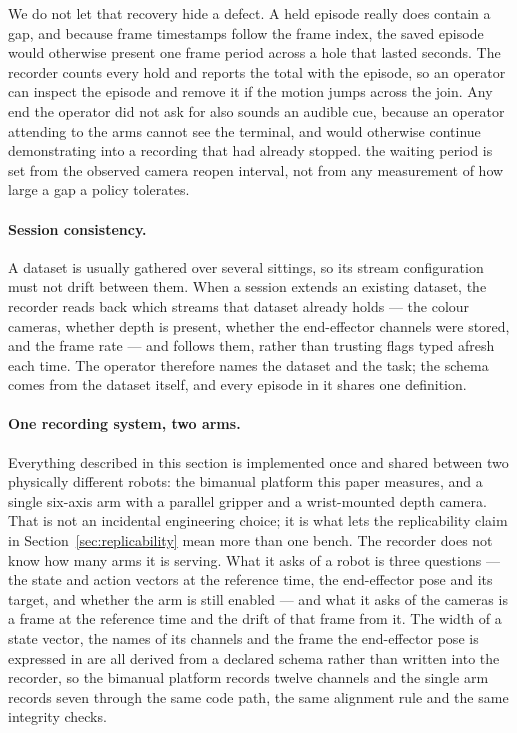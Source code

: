 We do not let that recovery hide a defect. A held episode really does contain a
gap, and because frame timestamps follow the frame index, the saved episode
would otherwise present one frame period across a hole that lasted seconds. The
recorder counts every hold and reports the total with the episode, so an
operator can inspect the episode and remove it if the motion jumps across the
join. Any end the operator did not ask for also sounds an audible cue, because
an operator attending to the arms cannot see the terminal, and would otherwise
continue demonstrating into a recording that had already stopped.
\unjustified{} the waiting period is set from the observed camera
reopen interval, not from any measurement of how large a gap a policy tolerates.

\paragraph{Session consistency.} A dataset is usually gathered over several
sittings, so its stream configuration must not drift between them. When a
session extends an existing dataset, the recorder reads back which streams
that dataset already holds --- the colour cameras, whether depth is present,
whether the end-effector channels were stored, and the frame rate --- and
follows them, rather than trusting flags typed afresh each time. The operator
therefore names the dataset and the task; the schema comes from the dataset
itself, and every episode in it shares one definition.

\paragraph{One recording system, two arms.} Everything described in this section
is implemented once and shared between two physically different robots: the
bimanual platform this paper measures, and a single six-axis arm with a parallel
gripper and a wrist-mounted depth camera. That is not an incidental engineering
choice; it is what lets the replicability claim in
Section~\ref{sec:replicability} mean more than one bench. The recorder does not
know how many arms it is serving. What it asks of a robot is three questions ---
the state and action vectors at the reference time, the end-effector pose and its
target, and whether the arm is still enabled --- and what it asks of the cameras
is a frame at the reference time and the drift of that frame from it. The width
of a state vector, the names of its channels and the frame the end-effector pose
is expressed in are all derived from a declared schema rather than written into
the recorder, so the bimanual platform records twelve channels and the single arm
records seven through the same code path, the same alignment rule and the same
integrity checks.

